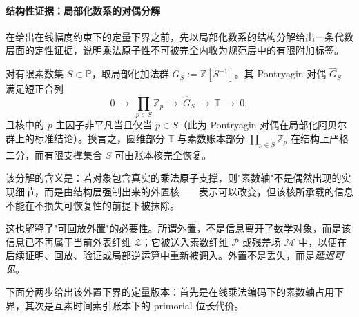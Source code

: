 \paragraph{结构性证据：局部化数系的对偶分解}
在给出在线幅度约束下的定量下界之前，先以局部化数系的结构分解给出一条代数层面的定性证据，说明乘法原子性不可被完全内收为规范层中的有限附加标签。

对有限素数集 $S\subset\mathbb{P}$，取局部化加法群 $G_S:=\mathbb{Z}[S^{-1}]$。其 Pontryagin 对偶 $\widehat{G}_S$ 满足短正合列
\begin{equation}\label{eq:pom-localized-ses}
0\ \longrightarrow\ \prod_{p\in S}\mathbb{Z}_p\ \longrightarrow\ \widehat{G}_S\ \longrightarrow\ \mathbb{T}\ \longrightarrow\ 0,
\end{equation}
且核中的 $p$-主因子非平凡当且仅当 $p\in S$（此为 Pontryagin 对偶在局部化阿贝尔群上的标准结论）。换言之，圆维部分 $\mathbb{T}$ 与素数账本部分 $\prod_{p\in S}\mathbb{Z}_p$ 在结构上严格二分，而有限支撑集合 $S$ 可由账本核完全恢复。

该分解的含义是：若对象包含真实的乘法原子支撑，则"素数轴"不是偶然出现的实现细节，而是由结构层强制出来的外置核——表示可以改变，但该核所承载的信息不能在不损失可恢复性的前提下被抹除。

这也解释了"可回放外置"的必要性。所谓外置，不是信息离开了数学对象，而是该信息已不再属于当前外表纤维 $\mathcal{Z}$；它被送入素数纤维 $\mathcal{P}$ 或残差场 $\mathcal{M}$ 中，以便在后续证明、回放、验证或局部逆运算中重新被调入。外置不是丢失，而是\emph{延迟可见}。

下面分两步给出该外置下界的定量版本：首先是在线乘法编码下的素数轴占用下界，其次是互素时间索引账本下的 primorial 位长代价。
